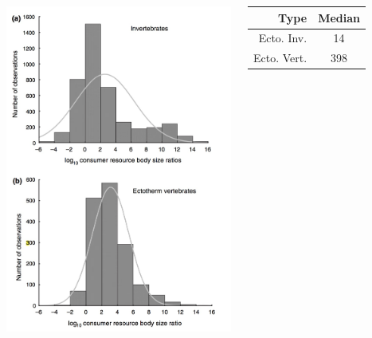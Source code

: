 \documentclass{beamer}
\begin{document}
\begin{frame}
{\begin{columns}[c]
\includegraphics[width=\textwidth]{BMR_BWM.jpg}
\begin{tabular}{r|c}
Type&Median\\
\hline
Ecto. Inv.&14\\
Ecto. Vert.&398\\
\end{tabular}
\end{columns}
}
\end{frame}
\end{document}
